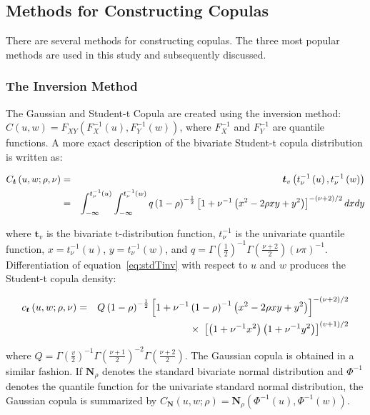 \documentclass[12pt]{article}
\begin{document}
\subsection{Methods for Constructing Copulas}

There are several methods for constructing copulas. The three most popular
methods are used in this study and subsequently discussed.

\subsubsection{The Inversion Method}

The Gaussian and Student-t Copula are created using the inversion method:
$C\left(u,w\right) = F_{XY}\left(F_{X}^{-1}\left(u\right),F_{Y}^{-1}\left(w\right)\right)$,
where $F_{X}^{-1}$ and $F_{Y}^{-1}$ are quantile functions. A more exact
description of the bivariate Student-t copula distribution is written as:

\begin{eqnarray} \label{eq:stdTinv}
C_{\boldsymbol{t}}\left(u,w;\rho,\nu\right) &=& \boldsymbol{t}_{v}\left(t_{\nu}^{-1}\left(u\right), t_{\nu}^{-1}\left(w\right)\right) \\
&=& \int_{-\infty}^{t_{\nu}^{-1}\left(u\right)}\int_{-\infty}^{t_{\nu}^{-1}\left(w\right)}q\left(1-\rho\right)^{-\frac{1}{2}}\left[1+\nu^{-1}\left(x^{2}-2\rho xy + y^{2}\right)\right]^{-\left(\nu + 2\right)
/2}dxdy \notag
\end{eqnarray}

where $\boldsymbol{t}_{v}$ is the bivariate t-distribution function,
$t_{\nu}^{-1}$ is the univariate quantile function,
$x = t_{\nu}^{-1}\left(u\right)$, $y = t_{\nu }^{-1}\left(w\right)$,
and $q = \Gamma\left(\frac{1}{2}\right)^{-1}\Gamma\left(\frac{\nu +2}{2}\right)\left(\nu\pi\right)^{-1}$.
Differentiation of equation~\ref{eq:stdTinv} with respect to $u$ and $w$
produces the Student-t copula density:

\begin{eqnarray}
c_{\boldsymbol{t}}\left(u,w;\rho,\nu\right) &=& Q\left(1-\rho\right)^{-\frac{1}{2}}\left[1+\nu^{-1}\left(1-\rho\right)^{-1}\left(x^{2}-2\rho xy+y^{2}\right)\right]^{-\left(\nu +2\right)/2} \notag \\
&& \times~\left[\left(1+\nu^{-1}x^{2}\right)\left(1+\nu^{-1}y^{2}\right)\right]^{\left(v+1\right)/2}
\end{eqnarray}

where $Q=\Gamma\left(\frac{v}{2}\right)^{-1}\Gamma\left(\frac{\nu +1}{2}\right)^{-2}\Gamma\left(\frac{\nu +2}{2}\right)$.
The Gaussian copula is obtained in a similar fashion. If $\boldsymbol{N}_{\rho}$
denotes the standard bivariate normal distribution and $\Phi^{-1}$ denotes
the quantile function for the univariate standard normal distribution, the
Gaussian copula is summarized by
$C_{\boldsymbol{N}}\left(u,w;\rho\right) = \boldsymbol{N}_{\rho}\left(\Phi^{-1}\left(u\right),\Phi^{-1}\left(w\right)\right)$.
\end{document}

